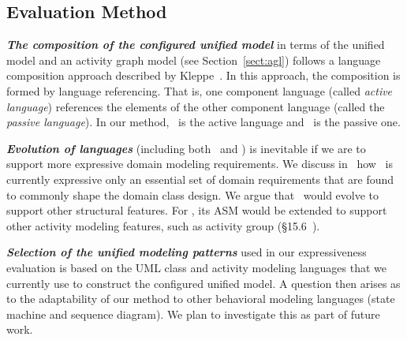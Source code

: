 \subsection{Evaluation Method}
%

\textbf{\textit{The composition of the configured unified model}} in terms of the unified model and an activity graph model (see Section~\ref{sect:agl}) follows a language composition approach described by Kleppe~\cite{kleppe_software_2008}. In this approach, the composition is formed by language referencing. That is, one component language (called \textit{active language}) references the elements of the other component language (called the \textit{passive language}). In our method, \agl~is the active language and \dcsl~is the passive one.

\textbf{\textit{Evolution of languages}} (including both \agl~and \dcsl) is inevitable if we are to support 
more expressive domain modeling requirements. We discuss in~\cite{le_domain_2018} how \dcsl~is currently expressive only \wrt an essential set of domain requirements that are found to commonly shape the domain class design. We argue that \dcsl~would evolve to support other structural features. For \agl, its ASM would be extended to support other activity modeling features, such as activity group (\S{15.6}~\cite{omg_unified_2015}).

\textbf{\textit{Selection of the unified modeling patterns}} used in our expressiveness evaluation is based on the UML class and activity modeling languages that we currently use to construct the configured unified model. A question then arises as to the adaptability of our method to other behavioral modeling languages (\eg state machine and sequence diagram). We plan to investigate this as part of future work.
